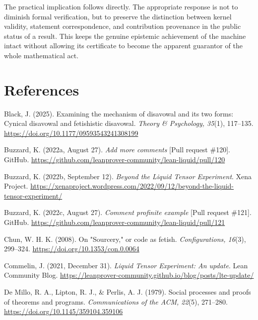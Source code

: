 \documentclass[pdflatex,sn-apa]{sn-jnl}
\begin{document}
The practical implication follows directly. The appropriate response is not to diminish formal verification, but to preserve the distinction between kernel validity, statement correspondence, and contribution provenance in the public status of a result. This keeps the genuine epistemic achievement of the machine intact without allowing its certificate to become the apparent guarantor of the whole mathematical act.
\section*{References}
\begingroup\raggedright

\noindent\hangindent=0.5in Black, J. (2025). Examining the mechanism of disavowal and its two forms: Cynical disavowal and fetishistic disavowal. \emph{Theory \& Psychology, 35}(1), 117--135. \url{https://doi.org/10.1177/09593543241308199}\par\medskip

\noindent\hangindent=0.5in Buzzard, K. (2022a, August 27). \emph{Add more comments} [Pull request \#120]. GitHub. \url{https://github.com/leanprover-community/lean-liquid/pull/120}\par\medskip

\noindent\hangindent=0.5in Buzzard, K. (2022b, September 12). \emph{Beyond the Liquid Tensor Experiment}. Xena Project. \url{https://xenaproject.wordpress.com/2022/09/12/beyond-the-liquid-tensor-experiment/}\par\medskip

\noindent\hangindent=0.5in Buzzard, K. (2022c, August 27). \emph{Comment profinite example} [Pull request \#121]. GitHub. \url{https://github.com/leanprover-community/lean-liquid/pull/121}\par\medskip

\noindent\hangindent=0.5in Chun, W. H. K. (2008). On "Sourcery," or code as fetish. \emph{Configurations, 16}(3), 299--324. \url{https://doi.org/10.1353/con.0.0064}\par\medskip

\noindent\hangindent=0.5in Commelin, J. (2021, December 31). \emph{Liquid Tensor Experiment: An update}. Lean Community Blog. \url{https://leanprover-community.github.io/blog/posts/lte-update/}\par\medskip

\noindent\hangindent=0.5in De Millo, R. A., Lipton, R. J., \& Perlis, A. J. (1979). Social processes and proofs of theorems and programs. \emph{Communications of the ACM, 22}(5), 271--280. \url{https://doi.org/10.1145/359104.359106}\par\medskip
\end{document}
